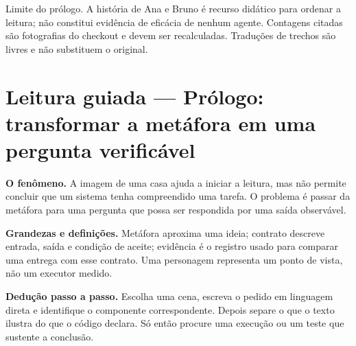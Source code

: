 \begin{aviso}
Limite do pr\'ologo. A hist\'oria de Ana e Bruno \'e recurso did\'atico para ordenar a leitura; n\~ao constitui evid\^encia de efic\'acia de nenhum agente. Contagens citadas s\~ao fotografias do checkout e devem ser recalculadas. Tradu\c{c}\~oes de trechos s\~ao livres e n\~ao substituem o original.
\end{aviso}


\section[Leitura guiada]{Leitura guiada — Prólogo: transformar a metáfora em uma pergunta verificável}
\begin{descricao}
\textbf{O fenômeno.} A imagem de uma casa ajuda a iniciar a leitura, mas não permite concluir que um sistema tenha compreendido uma tarefa. O problema é passar da metáfora para uma pergunta que possa ser respondida por uma saída observável.
\end{descricao}

\begin{definicao}
\textbf{Grandezas e definições.} Metáfora aproxima uma ideia; contrato descreve entrada, saída e condição de aceite; evidência é o registro usado para comparar uma entrega com esse contrato. Uma personagem representa um ponto de vista, não um executor medido.
\end{definicao}

\begin{metodo}
\textbf{Dedução passo a passo.} Escolha uma cena, escreva o pedido em linguagem direta e identifique o componente correspondente. Depois separe o que o texto ilustra do que o código declara. Só então procure uma execução ou um teste que sustente a conclusão.
\end{metodo}

